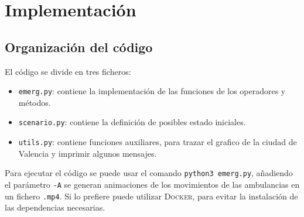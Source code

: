 
\section{Implementación}

\subsection{Organización del código}
{El código se divide en tres ficheros:\ns
\begin{itemize}
   \item \texttt{emerg.py}: contiene la implementación de las funciones de los operadores y métodos.
   \item \texttt{scenario.py}: contiene la definición de posibles estado iniciales.
   \item \texttt{utils.py}: contiene funciones auxiliares, para trazar el grafico de la ciudad de Valencia y imprimir algunos mensajes.
\end{itemize}}
Para ejecutar el código se puede usar el comando \texttt{python3 emerg.py}, añadiendo el parámetro \texttt{-A} se generan animaciones de los movimientos de las ambulancias en un fichero \texttt{.mp4}.
Si lo prefiere puede utilizar \textsc{Docker}, para evitar la instalación de las dependencias necesarias.

